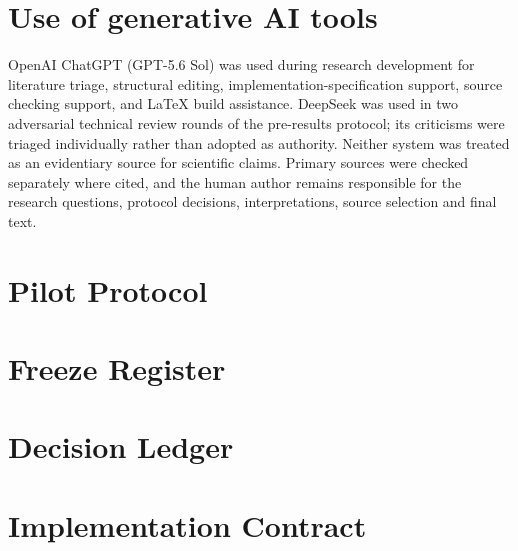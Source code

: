 \documentclass[11pt,a4paper]{article}
\begin{document}
\section*{Use of generative AI tools}
OpenAI ChatGPT (GPT-5.6 Sol) was used during research development for literature triage, structural editing, implementation-specification support, source checking support, and LaTeX build assistance. DeepSeek was used in two adversarial technical review rounds of the pre-results protocol; its criticisms were triaged individually rather than adopted as authority. Neither system was treated as an evidentiary source for scientific claims. Primary sources were checked separately where cited, and the human author remains responsible for the research questions, protocol decisions, interpretations, source selection and final text.

\clearpage
\appendix
\section{Pilot Protocol}


\section{Freeze Register}


\section{Decision Ledger}


\section{Implementation Contract}


\clearpage
\printbibliography[heading=bibintoc,title={References}]
\end{document}
